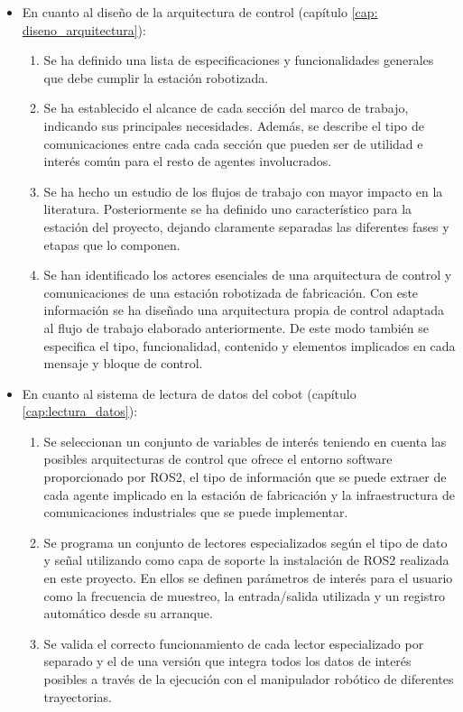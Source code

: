 \begin{itemize}
    \item En cuanto al diseño de la arquitectura de control (capítulo \ref{cap: diseno_arquitectura}):
    \begin{enumerate}
        \item Se ha definido una lista de especificaciones y funcionalidades generales que debe cumplir la estación robotizada.
        \item Se ha establecido el alcance de cada sección del marco de trabajo, indicando sus principales necesidades. Además, se describe el tipo de comunicaciones entre cada cada sección que pueden ser de utilidad e interés común para el resto de agentes involucrados.
        \item Se ha hecho un estudio de los flujos de trabajo con mayor impacto en la literatura. Posteriormente se ha definido uno característico para la estación del proyecto, dejando claramente separadas las diferentes fases y etapas que lo componen.
        \item Se han identificado los actores esenciales de una arquitectura de control y comunicaciones de una estación robotizada de fabricación. Con este información se ha diseñado una arquitectura propia de control adaptada al flujo de trabajo elaborado anteriormente. De este modo también se especifica el tipo, funcionalidad, contenido y elementos implicados en cada mensaje y bloque de control.
    \end{enumerate}

    \item En cuanto al sistema de lectura de datos del cobot (capítulo \ref{cap:lectura_datos}):
    \begin{enumerate}
        \item Se seleccionan un conjunto de variables de interés teniendo en cuenta las posibles arquitecturas de control que ofrece el entorno software proporcionado por ROS2, el tipo de información que se puede extraer de cada agente implicado en la estación de fabricación y la infraestructura de comunicaciones industriales que se puede implementar.
        \item Se programa un conjunto de lectores especializados según el tipo de dato y señal utilizando como capa de soporte la instalación de ROS2 realizada en este proyecto. En ellos se definen parámetros de interés para el usuario como la frecuencia de muestreo, la entrada/salida utilizada y un registro automático desde su arranque.
        \item Se valida el correcto funcionamiento de cada lector especializado por separado y el de una versión que integra todos los datos de interés posibles a través de la ejecución con el manipulador robótico de diferentes trayectorias. 
        

\end{enumerate}
\end{itemize}
